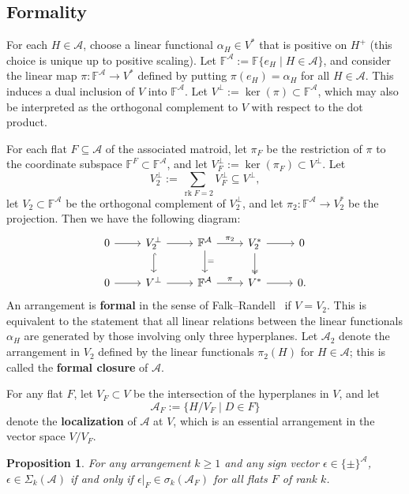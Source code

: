 \documentclass[11pt]{article}
\newtheorem{proposition}[theorem]{Proposition}
\theoremstyle{definition}
\renewcommand{\a}{\alpha}
\newcommand{\F}{\mathbb{F}}
\newcommand{\<}{\left<}
\renewcommand{\>}{\right>}
\newcommand{\A}{\mathcal{A}}
\newcommand{\cA}{\mathcal{A}}
\newcommand{\rk}{\operatorname{rk}}
\begin{document}
\subsection{Formality}\label{subsec:formality}
For each $H\in\cA$, choose a linear functional $\alpha_H\in V^*$  that is positive on $H^+$
(this choice is unique up to positive scaling).  Let $\F^\cA := \F\{e_H\mid H\in\cA\}$, and consider the 
linear map $\pi\colon\F^\A\to V^*$ defined by putting $\pi(e_H)=\alpha_H$ for all $H\in\cA$.
This induces a dual inclusion of $V$ into $\F^\cA$.  Let $V^\perp := \ker(\pi)\subset\F^\cA$, which
may also be interpreted as the orthogonal complement to $V$ with respect to the dot product.

For each flat $F\subseteq\A$ of the associated matroid, let $\pi_F$ be the restriction of
$\pi$ to the coordinate subspace $\F^F\subset\F^\cA$, and let $V_F^\perp :=\ker(\pi_F)\subset V^\perp$.  Let
\[
V_{2}^\perp := \sum_{\rk F = 2}V_F^\perp\subseteq V^\perp,
\]
let $V_2\subset\F^\cA$ be the orthogonal complement of $V_2^\perp$, and let $\pi_2:\F^\cA\to V_2^*$ be the projection.  Then we have the following diagram:
\[
\begin{tikzcd}
  0\ar[r] & V^\perp_{2}\ar[r]\ar[hookrightarrow,d] & \F^\A \ar[r,"\pi_{2}"]\ar[d,"="] & V^*_{2}
  \ar[twoheadrightarrow,d] \ar[r] & 0\\
  0\ar[r] & V^\perp \ar[r] & \F^\A\ar[r,"\pi"] & V^*\ar[r] & 0.
\end{tikzcd}
\]
An arrangement is {\bf formal} in the sense of Falk--Randell~\cite{FR86} if $V = V_2$.  This is equivalent to the statement that all linear relations between
the linear functionals $\a_H$ are generated by those involving only three hyperplanes.
Let $\A_{2}$ denote the arrangement in $V_{2}$ defined by the linear functionals $\pi_{2}(H)$ for $H\in\A$; this is called the 
{\bf formal closure} of $\A$.  

For any flat $F$, let $V_F \subset V$ be the intersection of the hyperplanes in $V$, and let $$\cA_F := \{H/V_F\mid D\in F\}$$ 
denote the {\bf localization} of $\cA$ at $V$, which is an essential arrangement in the vector space $V/V_F$.

\begin{proposition}\label{prop:local chambers}
  For any arrangement $k\geq 1$ and any sign vector $\epsilon\in\{\pm\}^\cA$, $\epsilon\in\Sigma_k(\cA)$ if 
  and only if $\epsilon|_F\in\sigma_k(\cA_F)$ for all flats $F$ of rank $k$.
\end{proposition}
\end{document}

